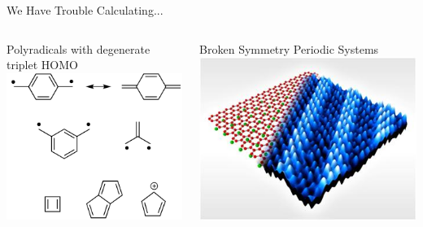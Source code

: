 \documentclass[10pt]{beamer}
\begin{document}
\begin{frame}{We Have Trouble Calculating...}
	\begin{columns}[c] %
		\begin{column}{.5\textwidth}

	      \centering
		    	Polyradicals with degenerate triplet HOMO \\ \centering \vspace{5mm}
		    	\centering 
		    	\includegraphics[width=0.8\linewidth]{../figures/diradicals.png}

		\end{column}
		\begin{column}{0.5\textwidth}		  
	      \centering
		    	Broken Symmetry Periodic Systems \\ \centering \vspace{5mm}
		    	\centering 
		    	\includegraphics[width=0.8\linewidth]{../figures/CDW_Rahnejat.jpg}
		\end{column}
	\end{columns}
\end{frame}
\end{document}
